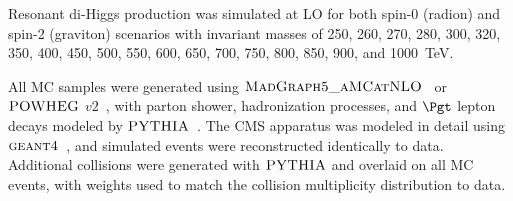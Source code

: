 Resonant di-Higgs production was simulated at LO for both spin-0 (radion) and spin-2 (graviton)
scenarios with invariant masses of 250, 260, 270, 280, 300, 320, 350, 400, 450, 500, 550, 600,
650, 700, 750, 800, 850, 900, and 1000~TeV.

All MC samples were generated using $\textsc{MadGraph5\_aMCatNLO}$~\cite{Alwall:2014hca} or
$\textsc{POWHEG}$ $v2$~\cite{Nason:2004rx,Frixione:2007vw,Alioli:2010xd}, with parton shower, hadronization
processes, and $\Pgt$ lepton decays modeled by
$\textsc{PYTHIA}$~\cite{PYTHIA_CUETP8M1tune_CMS,PYTHIA_CUETP8M2tune_CMS,Sirunyan:2019dfx,PYTHIA_MonashTune}.
The CMS apparatus was modeled in detail using $\textsc{geant4}$~\cite{Agostinelli:2002hh}, and simulated events
were reconstructed identically to data.  Additional collisions were generated with $\textsc{PYTHIA}$ and
overlaid on all MC events, with weights used to match the collision multiplicity distribution to data.
